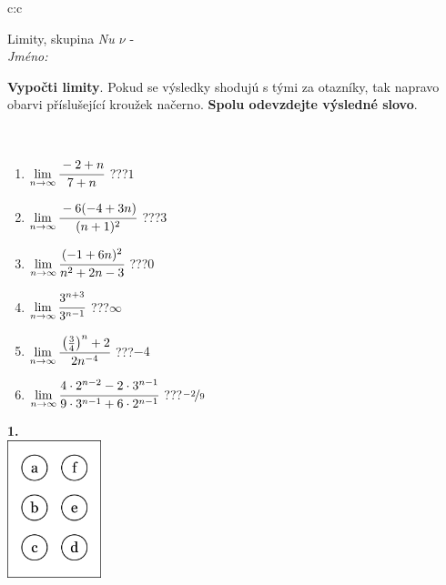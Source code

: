 \documentclass[10pt]{report}
\begin{document}
\begin{tabular}{c:c}
\begin{minipage}[c][104.5mm][t]{0.5\linewidth}
\begin{center}
\vspace{7mm}
{\huge Limity, skupina \textit{Nu $\nu$} -}\\[5mm]
\textit{Jméno:}\phantom{xxxxxxxxxxxxxxxxxxxxxxxxxxxxxxxxxxxxxxxxxxxxxxxxxxxxxxxxxxxxxxxxx}\\[5mm]
\begin{minipage}{0.95\linewidth}
\begin{center}
\textbf{Vypočti limity}. Pokud se výsledky shodujú s tými za otazníky, tak napravo\\obarvi příslušející kroužek načerno. \textbf{Spolu odevzdejte výsledné slovo}.
\end{center}
\end{minipage}
\\[1mm]
\begin{minipage}{0.79\linewidth}
\begin{center}
\begin{varwidth}{\linewidth}
\begin{enumerate}
\normalsize
\item $\lim\limits_{n\to\infty}\cfrac{-2+n}{7+n}$\quad \dotfill\; ???\;\dotfill \quad $1$
\item $\lim\limits_{n\to\infty}\cfrac{-6(-4+3n)}{(n+1)^2}$\quad \dotfill\; ???\;\dotfill \quad $3$
\item $\lim\limits_{n\to\infty}\cfrac{(-1+6n)^2}{n^2+2n-3}$\quad \dotfill\; ???\;\dotfill \quad $0$
\item $\lim\limits_{n\to\infty}\cfrac{3^{n+3}}{3^{n-1}}$\quad \dotfill\; ???\;\dotfill \quad $\infty$
\item $\lim\limits_{n\to\infty}\cfrac{\left(\frac{3}{4}\right)^n +2}{2n^{-4}}$\quad \dotfill\; ???\;\dotfill \quad $-4$
\item $\lim\limits_{n\to\infty}\cfrac{4\cdot 2^{n-2}-2\cdot 3^{n-1}}{9\cdot 3^{n-1}+6\cdot 2^{n-1}}$\quad \dotfill\; ???\;\dotfill \quad $\nicefrac{-2}{9}$
\end{enumerate}
\end{varwidth}
\end{center}
\end{minipage}
\begin{minipage}{0.20\linewidth}
\begin{center}
{\Huge\bfseries 1.} \\[2mm]
\includegraphics[height=40mm]{../images/braille.png}

\end{center}
\end{minipage}
\end{center}
\end{minipage}
\end{tabular}
\end{document}
